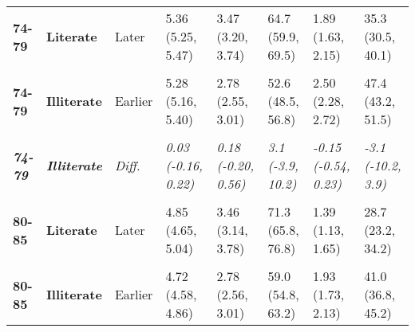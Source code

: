 \begin{table}[!h]
{{\begin{tabular}[t]{>{}l>{}lllllll}
\cmidrule{1-8}
\textbf{74-79} & \textbf{Literate} & Later & 5.36 (5.25, 5.47) & 3.47 (3.20, 3.74) & 64.7 (59.9, 69.5) & 1.89 (1.63, 2.15) & 35.3 (30.5, 40.1)\\
\cmidrule{1-8}
\em{\textbf{\cellcolor{gray!10}{74-79}}} & \em{\textbf{\cellcolor{gray!10}{Literate}}} & \em{\cellcolor{gray!10}{Diff.}} & \em{\cellcolor{gray!10}{0.02 (-0.13, 0.18)}} & \em{\cellcolor{gray!10}{0.47 (0.11, 0.82)**}} & \em{\cellcolor{gray!10}{8.5 (2.2, 14.8)**}} & \em{\cellcolor{gray!10}{-0.44 (-0.78, -0.10)*}} & \em{\cellcolor{gray!10}{-8.5 (-14.8, -2.2)**}}\\
\cmidrule{1-8}
\textbf{74-79} & \textbf{Illiterate} & Earlier & 5.28 (5.16, 5.40) & 2.78 (2.55, 3.01) & 52.6 (48.5, 56.8) & 2.50 (2.28, 2.72) & 47.4 (43.2, 51.5)\\
\cmidrule{1-8}
\textbf{\cellcolor{gray!10}{74-79}} & \textbf{\cellcolor{gray!10}{Illiterate}} & \cellcolor{gray!10}{Later} & \cellcolor{gray!10}{5.31 (5.16, 5.46)} & \cellcolor{gray!10}{2.96 (2.66, 3.26)} & \cellcolor{gray!10}{55.8 (50.1, 61.5)} & \cellcolor{gray!10}{2.35 (2.03, 2.67)} & \cellcolor{gray!10}{44.2 (38.5, 49.9)}\\
\cmidrule{1-8}
\em{\textbf{74-79}} & \em{\textbf{Illiterate}} & \em{Diff.} & \em{0.03 (-0.16, 0.22)} & \em{0.18 (-0.20, 0.56)} & \em{3.1 (-3.9, 10.2)} & \em{-0.15 (-0.54, 0.23)} & \em{-3.1 (-10.2, 3.9)}\\
\cmidrule{1-8}
\textbf{\cellcolor{gray!10}{80-85}} & \textbf{\cellcolor{gray!10}{Literate}} & \cellcolor{gray!10}{Earlier} & \cellcolor{gray!10}{4.81 (4.62, 5.00)} & \cellcolor{gray!10}{2.74 (2.45, 3.03)} & \cellcolor{gray!10}{57.0 (51.1, 62.8)} & \cellcolor{gray!10}{2.07 (1.77, 2.37)} & \cellcolor{gray!10}{43.0 (37.2, 48.9)}\\
\cmidrule{1-8}
\textbf{80-85} & \textbf{Literate} & Later & 4.85 (4.65, 5.04) & 3.46 (3.14, 3.78) & 71.3 (65.8, 76.8) & 1.39 (1.13, 1.65) & 28.7 (23.2, 34.2)\\
\cmidrule{1-8}
\em{\textbf{\cellcolor{gray!10}{80-85}}} & \em{\textbf{\cellcolor{gray!10}{Literate}}} & \em{\cellcolor{gray!10}{Diff.}} & \em{\cellcolor{gray!10}{0.04 (-0.23, 0.31)}} & \em{\cellcolor{gray!10}{0.72 (0.28, 1.15)**}} & \em{\cellcolor{gray!10}{14.4 (6.3, 22.4)***}} & \em{\cellcolor{gray!10}{-0.68 (-1.08, -0.28)***}} & \em{\cellcolor{gray!10}{-14.4 (-22.4, -6.3)***}}\\
\cmidrule{1-8}
\textbf{80-85} & \textbf{Illiterate} & Earlier & 4.72 (4.58, 4.86) & 2.78 (2.56, 3.01) & 59.0 (54.8, 63.2) & 1.93 (1.73, 2.13) & 41.0 (36.8, 45.2)\\

\end{tabular}}}
\end{table}
